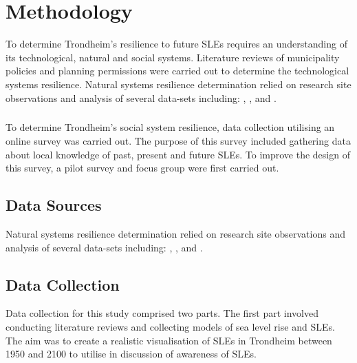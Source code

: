 
\chapter{Methodology}
To determine Trondheim's resilience to future SLEs requires an understanding of its technological, natural and social systems. Literature reviews of  municipality policies and planning permissions were carried out to determine the technological systems resilience. Natural systems resilience determination relied on research site observations and analysis of several  data-sets including: \cite{geonorge_stormflo_nodate} , \cite{kartverket_se_2021}, \cite{stormflo_database_stormflo_2021} and \cite{ipcc_sea_2021}. 
\paragraph{}
To determine Trondheim's social system resilience, data collection utilising an online survey was carried out. The purpose of this survey included gathering data about local knowledge of past, present and future SLEs. To improve the design of this survey, a pilot survey and focus group were first carried out.  

\section{Data Sources}
 Natural systems resilience determination relied on research site observations and analysis of several  data-sets including: \cite{geonorge_stormflo_nodate} , \cite{kartverket_se_2021}, \cite{stormflo_database_stormflo_2021} and \cite{ipcc_sea_2021}. 

 
\section{Data Collection}

Data collection for this study comprised two parts.  The first part involved conducting literature reviews and collecting models of sea level rise and SLEs. The aim was to create a realistic visualisation of SLEs in Trondheim between 1950 and 2100 to utilise in discussion of awareness of SLEs. 
\paragraph{}

